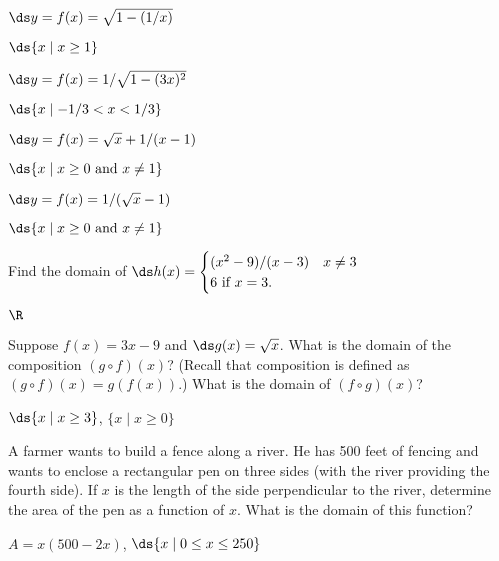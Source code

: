 \begin{exercises}
\begin{exercise} $\ds y=f(x)=\sqrt{1-(1/x)}$
\begin{answer} $\ds \{x\mid x\ge 1\}$
\end{answer}\end{exercise}
\begin{exercise} $\ds y=f(x)=1/\sqrt{1-(3x)^2}$
\begin{answer} $\ds \{x\mid -1/3< x< 1/3\}$
\end{answer}\end{exercise}
\begin{exercise} $\ds y=f(x)=\sqrt{x}+1/(x-1)$
\begin{answer} $\ds \{x\mid x\ge0  \hbox{ and } x\not=1\}$
\end{answer}\end{exercise}
\begin{exercise} $\ds y=f(x)=1/(\sqrt{x}-1)$
\begin{answer} $\ds \{x\mid x\ge0  \hbox{ and } x\not=1\}$
\end{answer}\end{exercise}

\begin{exercise} Find the domain of $\ds h(x) = \begin{cases}
(x^2-9)/(x-3)& x\neq 3 \\
 6 \mbox{ if $x=3$.} \end{cases}$
\begin{answer} $\R$
\end{answer}\end{exercise}

\begin{exercise} Suppose $f(x) = 3x-9$ and $\ds g(x) = \sqrt{x}$.  What is the
domain of the composition $(g\circ f)(x)$?  (Recall that 
{\dfont composition%
\/}
is defined as $(g\circ f)(x) = g(f(x))$.)  What is the
domain of $(f\circ g)(x)$?
\begin{answer} $\ds \{x\mid x\ge3\}$, $\{x\mid x\ge0\}$
\end{answer}\end{exercise}

\begin{exercise} A farmer wants to build a fence along a river.  He has
500 feet of fencing and wants to enclose a rectangular pen on three
sides (with the river providing the fourth side).  If $x$ is the
length of the side perpendicular to the river, determine the area of
the pen as a function of $x$.  What is the domain of this function?
\begin{answer} $A=x(500-2x)$, $\ds \{x\mid 0\le x\le 250\}$
\end{answer}\end{exercise}


\end{exercises}
